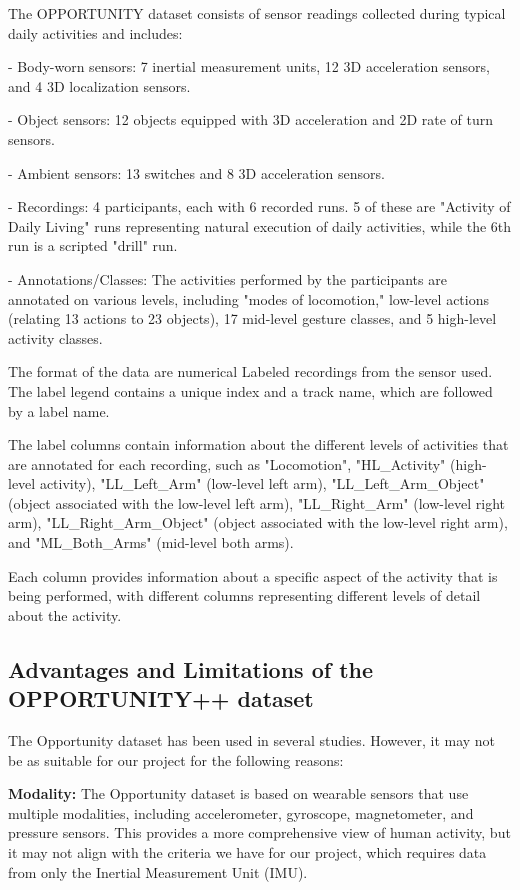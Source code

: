 The OPPORTUNITY dataset consists of sensor readings collected during typical daily activities and includes:

- Body-worn sensors: 7 inertial measurement units, 12 3D acceleration sensors, and 4 3D localization sensors.

- Object sensors: 12 objects equipped with 3D acceleration and 2D rate of turn sensors.

- Ambient sensors: 13 switches and 8 3D acceleration sensors.

- Recordings: 4 participants, each with 6 recorded runs. 5 of these are "Activity of Daily Living" runs representing natural execution of daily activities, while the 6th run is a scripted "drill" run.

- Annotations/Classes: The activities performed by the participants are annotated on various levels, including "modes of locomotion," low-level actions (relating 13 actions to 23 objects), 17 mid-level gesture classes, and 5 high-level activity classes.


The format of the data are numerical Labeled recordings from the sensor used. The label legend contains a unique index and a track name, which are followed by a label name.

 The label columns contain information about the different levels of activities that are annotated for each recording, such as "Locomotion", "HL\_Activity" (high-level activity), "LL\_Left\_Arm" (low-level left arm), "LL\_Left\_Arm\_Object" (object associated with the low-level left arm), "LL\_Right\_Arm" (low-level right arm), "LL\_Right\_Arm\_Object" (object associated with the low-level right arm), and "ML\_Both\_Arms" (mid-level both arms). 

Each column provides information about a specific aspect of the activity that is being performed, with different columns representing different levels of detail about the activity. \cite{Roggen:2010} 
\subsection{Advantages and Limitations of the OPPORTUNITY++ dataset}

The Opportunity dataset has been used in several studies. However, it may not be as suitable for our project for the following reasons:

\textbf{Modality:} The Opportunity dataset is based on wearable sensors that use multiple modalities, including accelerometer, gyroscope, magnetometer, and pressure sensors. This provides a more comprehensive view of human activity, but it may not align with the criteria we have for our project, which requires data from only the Inertial Measurement Unit (IMU).

